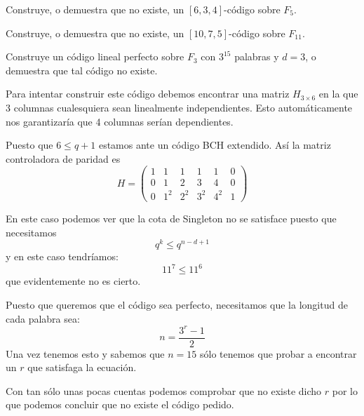 \begin{problem}[10]
\ppart Construye, o demuestra que no existe, un $[6,3,4]$-código
sobre  $ F_5$.

\ppart Construye, o demuestra que no existe, un $[10,7,5]$-código sobre  $ F_{11}$.

\ppart Construye un código lineal perfecto sobre $ F_3$ con $3^{15}$
palabras y $d=3$, o demuestra que tal código no existe.

\solution

\spart
Para intentar construir este código debemos encontrar una matriz $H_{3 \times 6}$ en la que 3 columnas cualesquiera sean linealmente independientes. Esto automáticamente nos garantizaría que 4 columnas serían dependientes.

Puesto que $6\leq q+1$ estamos ante un código BCH extendido. Así la matriz controladora de paridad es
\[H = \left(\begin{array}{cccccc}
1 & 1 & 1 & 1 & 1 & 0 \\
0 & 1 & 2 & 3 & 4 & 0 \\
0 & 1^2 & 2^2 & 3^2 & 4^2 & 1
\end{array} \right)\]

\spart

En este caso podemos ver que la cota de Singleton no se satisface puesto que necesitamos
\[q^k \leq q^{n-d+1}\]
y en este caso tendríamos:
\[11^7 \leq 11^6\]
que evidentemente no es cierto.

\spart

Puesto que queremos que el código sea perfecto, necesitamos que la longitud de cada palabra sea:
\[n=\frac{3^r-1}{2}\]
Una vez tenemos esto y sabemos que $n=15$ sólo tenemos que probar a encontrar un $r$ que satisfaga la ecuación.

Con tan sólo unas pocas cuentas podemos comprobar que no existe dicho $r$ por lo que podemos concluir que no existe el código pedido.

\end{problem}

